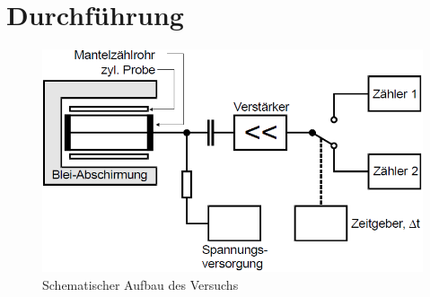 \section{Durchführung}
\label{sec:Durchführung}


\begin{figure}
    \centering
    \includegraphics[width=\textwidth]{data/aufbau.png}
    \caption{Schematischer Aufbau des Versuchs \cite{V702}}
    \label{fig:aufbau}
\end{figure}

